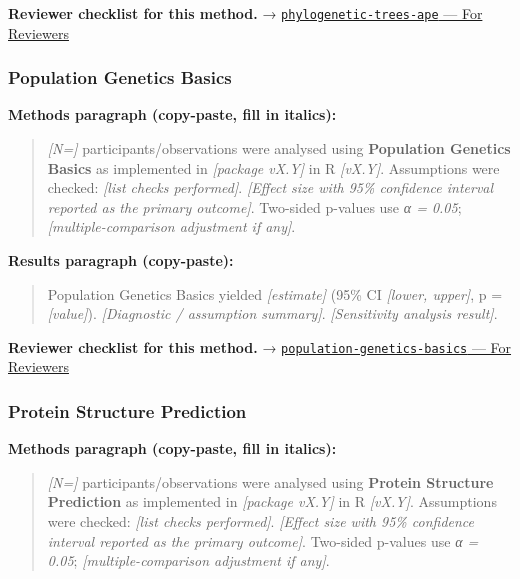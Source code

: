 \documentclass[
]{article}
\begin{document}
\textbf{Reviewer checklist for this method.} →
\href{../chapters/12-bioinformatics/phylogenetic-trees-ape.Rmd\#for-reviewers}{\texttt{phylogenetic-trees-ape}
--- For Reviewers}

\subsubsection{Population Genetics
Basics}\label{population-genetics-basics}

\textbf{Methods paragraph (copy-paste, fill in italics):}

\begin{quote}
\emph{{[}N={]}} participants/observations were analysed using
\textbf{Population Genetics Basics} as implemented in \emph{{[}package
vX.Y{]}} in R \emph{{[}vX.Y{]}}. Assumptions were checked: \emph{{[}list
checks performed{]}}. \emph{{[}Effect size with 95\% confidence interval
reported as the primary outcome{]}}. Two-sided p-values use \emph{α =
0.05}; \emph{{[}multiple-comparison adjustment if any{]}}.
\end{quote}

\textbf{Results paragraph (copy-paste):}

\begin{quote}
Population Genetics Basics yielded \emph{{[}estimate{]}} (95\% CI
\emph{{[}lower, upper{]}}, p = \emph{{[}value{]}}). \emph{{[}Diagnostic
/ assumption summary{]}}. \emph{{[}Sensitivity analysis result{]}}.
\end{quote}

\textbf{Reviewer checklist for this method.} →
\href{../chapters/12-bioinformatics/population-genetics-basics.Rmd\#for-reviewers}{\texttt{population-genetics-basics}
--- For Reviewers}

\subsubsection{Protein Structure
Prediction}\label{protein-structure-prediction}

\textbf{Methods paragraph (copy-paste, fill in italics):}

\begin{quote}
\emph{{[}N={]}} participants/observations were analysed using
\textbf{Protein Structure Prediction} as implemented in \emph{{[}package
vX.Y{]}} in R \emph{{[}vX.Y{]}}. Assumptions were checked: \emph{{[}list
checks performed{]}}. \emph{{[}Effect size with 95\% confidence interval
reported as the primary outcome{]}}. Two-sided p-values use \emph{α =
0.05}; \emph{{[}multiple-comparison adjustment if any{]}}.
\end{quote}
\end{document}
